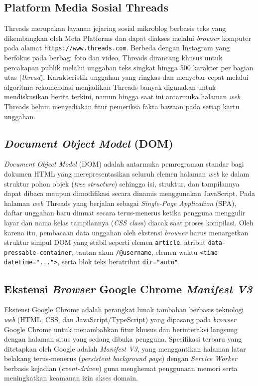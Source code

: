 \documentclass[12pt,a4paper,twoside]{report}
\begin{document}
\subsection{Platform Media Sosial Threads}

Threads merupakan layanan jejaring sosial mikroblog berbasis teks yang dikembangkan oleh Meta Platforms dan dapat diakses melalui \textit{browser} komputer pada alamat \texttt{https://www.threads.com}. Berbeda dengan Instagram yang berfokus pada berbagi foto dan video, Threads dirancang khusus untuk percakapan publik melalui unggahan teks singkat hingga 500 karakter per bagian utas (\textit{thread}). Karakteristik unggahan yang ringkas dan menyebar cepat melalui algoritma rekomendasi menjadikan Threads banyak digunakan untuk mendiskusikan berita terkini, namun hingga saat ini antarmuka halaman \textit{web} Threads belum menyediakan fitur pemeriksa fakta bawaan pada setiap kartu unggahan.

\subsection{\textit{Document Object Model} (DOM)}

\textit{Document Object Model} (DOM) adalah antarmuka pemrograman standar bagi dokumen HTML yang merepresentasikan seluruh elemen halaman \textit{web} ke dalam struktur pohon objek (\textit{tree structure}) sehingga isi, struktur, dan tampilannya dapat dibaca maupun dimodifikasi secara dinamis menggunakan JavaScript. Pada halaman \textit{web} Threads yang berjalan sebagai \textit{Single-Page Application} (SPA), daftar unggahan baru dimuat secara terus-menerus ketika pengguna menggulir layar dan nama kelas tampilannya (\textit{CSS class}) diacak saat proses kompilasi. Oleh karena itu, pembacaan data unggahan oleh ekstensi \textit{browser} harus menargetkan struktur simpul DOM yang stabil seperti elemen \texttt{article}, atribut \texttt{data-pressable-container}, tautan akun \texttt{/@username}, elemen waktu \texttt{<time datetime="...">}, serta blok teks beratribut \texttt{dir="auto"}.

\subsection{Ekstensi \textit{Browser} Google Chrome \textit{Manifest V3}}

Ekstensi Google Chrome adalah perangkat lunak tambahan berbasis teknologi \textit{web} (HTML, CSS, dan JavaScript/TypeScript) yang dipasang pada \textit{browser} Google Chrome untuk menambahkan fitur khusus dan berinteraksi langsung dengan halaman situs yang sedang dibuka pengguna. Spesifikasi terbaru yang ditetapkan oleh Google adalah \textit{Manifest V3}, yang menggantikan halaman latar belakang terus-menerus (\textit{persistent background page}) dengan \textit{Service Worker} berbasis kejadian (\textit{event-driven}) guna menghemat penggunaan memori serta meningkatkan keamanan izin akses domain.
\end{document}
